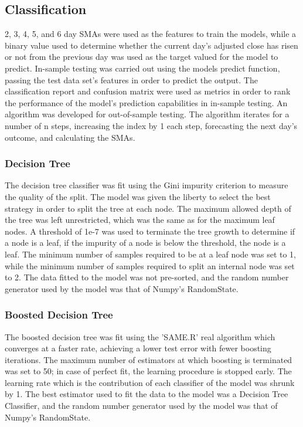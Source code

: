 \subsection{Classification}
2, 3, 4, 5, and 6 day SMAs were used as the features to train the models, while a binary value used to determine whether the current day's adjusted close has risen or not from the previous day was used as the target valued for the model to predict. In-sample testing was carried out using the models predict function, passing the test data set's features in order to predict the output. The classification report and confusion matrix were used as metrics in order to rank the performance of the model's prediction capabilities in in-sample testing. An algorithm was developed for out-of-sample testing. The algorithm iterates for a number of n steps, increasing the index by 1 each step, forecasting the next day's outcome, and calculating the SMAs. 

\subsubsection{Decision Tree}
The decision tree classifier was fit using the Gini impurity criterion to measure the quality of the split. The model was given the liberty to select the best strategy in order to split the tree at each node. The maximum allowed depth of the tree was left unrestricted, which was the same as for the maximum leaf nodes. A threshold of 1e-7 was used to terminate the tree growth to determine if a node is a leaf, if the impurity of a node is below the threshold, the node is a leaf. The minimum number of samples required to be at a leaf node was set to 1, while the minimum number of samples required to split an internal node was set to 2. The data fitted to the model was not pre-sorted, and the random number generator used by the model was that of Numpy's RandomState.

\subsubsection{Boosted Decision Tree}
The boosted decision tree was fit using the 'SAME.R' real algorithm which converges at a faster rate, achieving a lower test error with fewer boosting iterations. The maximum number of estimators at which boosting is terminated was set to 50; in case of perfect fit, the learning procedure is stopped early. The learning rate which is the contribution of each classifier of the model was shrunk by 1. The best estimator used to fit the data to the model was a Decision Tree Classifier, and the random number generator used by the model was that of Numpy's RandomState. 

